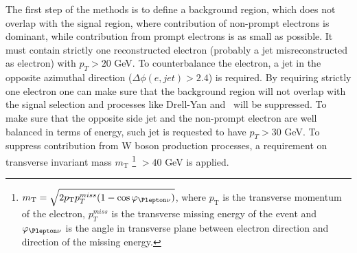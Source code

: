 The first step of the methods is to define a background region, which does not overlap with the signal region, where 
contribution of non-prompt electrons is dominant, while contribution from prompt electrons is as small as possible.
It must contain strictly one reconstructed electron (probably a jet misreconstructed as electron) with $p_T > 20$ GeV.
To counterbalance the electron, a jet in the opposite azimuthal direction ($\Delta \phi (e,jet) > 2.4$) is required.
By requiring strictly one electron one can make sure that the background region will not overlap with the signal selection and processes 
like Drell-Yan and \ttbar~will be suppressed.
To make sure that the opposite side jet and the non-prompt electron are well balanced in terms of energy, such jet is
requested to have $p_T > 30$ GeV.
To suppress contribution from W boson production processes, a requirement on transverse invariant mass 
$m_\mathrm{T}$
\footnote{$m_\mathrm{T} = \sqrt{2 p_\mathrm{T} p_T^{miss} (1-\cos\varphi_{\Plepton\nu})}$, where
$p_\mathrm{T}$ is the transverse momentum of the electron, $p_T^{miss}$ is the transverse missing energy of the event
and $\varphi_{\Plepton\nu}$ is the angle in transverse plane between electron direction and direction of the missing energy.}
$ > 40$ GeV is applied.

